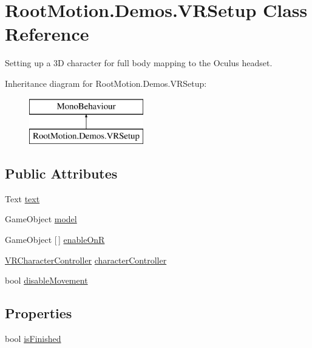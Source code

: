 \hypertarget{class_root_motion_1_1_demos_1_1_v_r_setup}{}\section{Root\+Motion.\+Demos.\+V\+R\+Setup Class Reference}
\label{class_root_motion_1_1_demos_1_1_v_r_setup}


Setting up a 3D character for full body mapping to the Oculus headset.  


Inheritance diagram for Root\+Motion.\+Demos.\+V\+R\+Setup\+:\begin{figure}[H]
\begin{center}
\leavevmode
\includegraphics[height=2.000000cm]{class_root_motion_1_1_demos_1_1_v_r_setup}
\end{center}
\end{figure}
\subsection*{Public Attributes}
\begin{DoxyCompactItemize}
\item 
Text \mbox{\hyperlink{class_root_motion_1_1_demos_1_1_v_r_setup_ab7e40c2ace9aa51547f4ab6ba4555844}{text}}
\item 
Game\+Object \mbox{\hyperlink{class_root_motion_1_1_demos_1_1_v_r_setup_ab227fec4e5120780a12ec708c36eaa2d}{model}}
\item 
Game\+Object \mbox{[}$\,$\mbox{]} \mbox{\hyperlink{class_root_motion_1_1_demos_1_1_v_r_setup_aca60a0ec4822229af320fbdca9fd00d1}{enable\+OnR}}
\item 
\mbox{\hyperlink{class_root_motion_1_1_demos_1_1_v_r_character_controller}{V\+R\+Character\+Controller}} \mbox{\hyperlink{class_root_motion_1_1_demos_1_1_v_r_setup_ab301d9835352884dbaabd1a8149fceca}{character\+Controller}}
\item 
bool \mbox{\hyperlink{class_root_motion_1_1_demos_1_1_v_r_setup_a6403a2a49f15607d93e09280e51c30ec}{disable\+Movement}}
\end{DoxyCompactItemize}
\subsection*{Properties}
\begin{DoxyCompactItemize}
\item 
bool \mbox{\hyperlink{class_root_motion_1_1_demos_1_1_v_r_setup_a55a66c18dea1af5dfb0ea1dfe6635d83}{is\+Finished}}
\end{DoxyCompactItemize}


